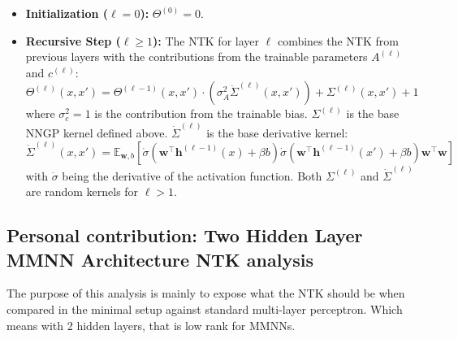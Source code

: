 \documentclass[a4paper]{article}
\theoremstyle{plain}
\theoremstyle{definition}
\theoremstyle{remark}
\begin{document}
\begin{tcolorbox}[colback=blue!10,colframe=blue!80!black,title={\textbf{NTK Recursion Formula}},enhanced,drop shadow,boxrule=2pt]
\begin{itemize}
    \item \textbf{Initialization (\(\ell=0\)):} $\Theta^{(0)} = 0$.
    
    \item \textbf{Recursive Step (\(\ell \ge 1\)):} The NTK for layer $\ell$ combines the NTK from previous layers with the contributions from the trainable parameters $A^{(\ell)}$ and $c^{(\ell)}$:
    \begin{equation}
        \boxed{
        \Theta^{(\ell)}(x, x') = \Theta^{(\ell-1)}(x, x') \cdot \left(\sigma_A^2\dot{\Sigma}^{(\ell)}(x, x')\right) + \Sigma^{(\ell)}(x, x') + 1
        }
    \end{equation}
    where $\sigma_c^2=1$ is the contribution from the trainable bias. $\Sigma^{(\ell)}$ is the base NNGP kernel defined above. $\dot{\Sigma}^{(\ell)}$ is the base derivative kernel:
    \begin{equation}
        \dot{\Sigma}^{(\ell)}(x, x') = \mathbb{E}_{\bm{w}, b} \left[ \dot{\sigma}\left(\bm{w}^\top \bm{h}^{(\ell-1)}(x) + \beta b\right) \dot{\sigma}\left(\bm{w}^\top \bm{h}^{(\ell-1)}(x') + \beta b\right) \bm{w}^\top\bm{w} \right]
    \end{equation}
    with $\dot{\sigma}$ being the derivative of the activation function. Both $\Sigma^{(\ell)}$ and $\dot{\Sigma}^{(\ell)}$ are random kernels for $\ell > 1$.
\end{itemize}
\end{tcolorbox}









\subsection{Personal contribution: Two Hidden Layer MMNN Architecture NTK analysis}
The purpose of this analysis is mainly to expose what the NTK should be when compared in the minimal setup against standard multi-layer perceptron.
Which means with 2 hidden layers, that is low rank for MMNNs.
\end{document}
